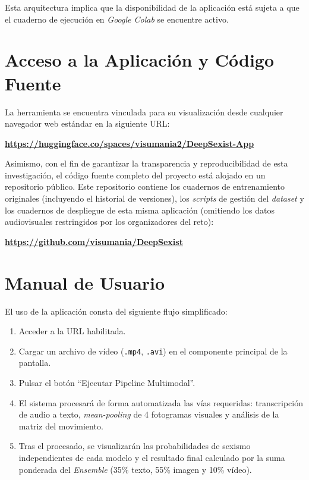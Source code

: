 Esta arquitectura implica que la disponibilidad de la aplicación está sujeta a que el cuaderno de ejecución en \textit{Google Colab} se encuentre activo.

\section*{Acceso a la Aplicación y Código Fuente}
La herramienta se encuentra vinculada para su visualización desde cualquier navegador web estándar en la siguiente URL:

\begin{center}
\textbf{\url{https://huggingface.co/spaces/visumania2/DeepSexist-App}}
\end{center}

Asimismo, con el fin de garantizar la transparencia y reproducibilidad de esta investigación, el código fuente completo del proyecto está alojado en un repositorio público. Este repositorio contiene los cuadernos de entrenamiento originales (incluyendo el historial de versiones), los \textit{scripts} de gestión del \textit{dataset} y los cuadernos de despliegue de esta misma aplicación (omitiendo los datos audiovisuales restringidos por los organizadores del reto):
\begin{center}
\textbf{\url{https://github.com/visumania/DeepSexist}}
\end{center}

\section*{Manual de Usuario}
El uso de la aplicación consta del siguiente flujo simplificado:

\begin{enumerate}
    \item Acceder a la URL habilitada.
    \item Cargar un archivo de vídeo (\texttt{.mp4}, \texttt{.avi}) en el componente principal de la pantalla. 
    \item Pulsar el botón ``Ejecutar Pipeline Multimodal''.
    \item El sistema procesará de forma automatizada las vías requeridas: transcripción de audio a texto, \textit{mean-pooling} de 4 fotogramas visuales y análisis de la matriz del movimiento. 
    \item Tras el procesado, se visualizarán las probabilidades de sexismo independientes de cada modelo y el resultado final calculado por la suma ponderada del \textit{Ensemble} (35\% texto, 55\% imagen y 10\% vídeo).
\end{enumerate}


